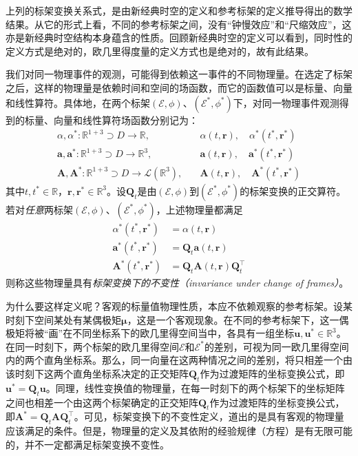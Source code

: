 \documentclass[main.tex]{subfiles}
\begin{document}
上列的标架变换关系式，是由新经典时空的定义和参考标架的定义推导得出的数学结果。从它的形式上看，不同的参考标架之间，没有“钟慢效应”和“尺缩效应”，这亦是新经典时空结构本身蕴含的性质。回顾新经典时空的定义可以看到，同时性的定义方式是绝对的，欧几里得度量的定义方式也是绝对的，故有此结果。

我们对同一物理事件的观测，可能得到依赖这一事件的不同物理量。在选定了标架之后，这样的物理量是依赖时间和空间的场函数，而它的函数值可以是标量、向量和线性算符。具体地，在两个标架$\left(\mathcal{E},\phi\right)$、$\left(\mathcal{E}^*,\phi^*\right)$下，对同一物理事件观测得到的标量、向量和线性算符场函数分别记为：
\begin{align*}
    \alpha,\alpha^*:\mathbb{R}^{1+3}\supset D\rightarrow\mathbb{R},\quad                                   & \alpha\left(t,\mathbf{r}\right),\quad      \alpha^*\left(t^*,\mathbf{r}^*\right)     \\
    \mathbf{a},\mathbf{a}^*:\mathbb{R}^{1+3}\supset D\rightarrow\mathbb{R}^3,\quad                         & \mathbf{a}\left(t,\mathbf{r}\right),\quad  \mathbf{a}^*\left(t^*,\mathbf{r}^*\right) \\
    \mathbf{A},\mathbf{A}^*:\mathbb{R}^{1+3}\supset D\rightarrow\mathcal{L}\left(\mathbb{R}^3\right),\quad & \mathbf{A}\left(t,\mathbf{r}\right),\quad  \mathbf{A}^*\left(t^*,\mathbf{r}^*\right)
\end{align*}
其中$t,t^*\in\mathbb{R}$，$\mathbf{r},\mathbf{r}^*\in\mathbb{R}^3$。设$\mathbf{Q}_t$是由$\left(\mathcal{E},\phi\right)$到$\left(\mathcal{E}^*,\phi^*\right)$的标架变换的正交算符。若对\emph{任意}两标架$\left(\mathcal{E},\phi\right)$、$\left(\mathcal{E}^*,\phi^*\right)$，上述物理量都满足
\begin{align*}
    \alpha^*\left(t^*,\mathbf{r}^*\right)     & =\alpha\left(t,\mathbf{r}\right)                                       \\
    \mathbf{a}^*\left(t^*,\mathbf{r}^*\right) & =\mathbf{Q}_t\mathbf{a}\left(t,\mathbf{r}\right)                       \\
    \mathbf{A}^*\left(t^*,\mathbf{r}^*\right) & =\mathbf{Q}_t\mathbf{A}\left(t,\mathbf{r}\right)\mathbf{Q}_t^\intercal
\end{align*}
则称这些物理量具有\emph{标架变换下的不变性（invariance under change of frames）}。

为什么要这样定义呢？客观的标量值物理性质，本应不依赖观察的参考标架。设某时刻下空间某处有某偶极矩$\symbf{\mu}$，这是一个客观现象。在不同的参考标架下，这一偶极矩将被“画”在不同坐标系下的欧几里得空间当中，各具有一组坐标$\mathbf{u},\mathbf{u}^*\in\mathbb{R}^3$。在同一时刻下，两个标架的欧几里得空间$\mathcal{E}$和$\mathcal{E}^*$的差别，可视为同一欧几里得空间内的两个直角坐标系。那么，同一向量在这两种情况之间的差别，将只相差一个由该时刻下这两个直角坐标系决定的正交矩阵$\mathbf{Q}_t$作为过渡矩阵的坐标变换公式，即$\mathbf{u}^*=\mathbf{Q}_t\mathbf{u}$。同理，线性变换值的物理量，在每一时刻下的两个标架下的坐标矩阵之间也相差一个由这两个标架确定的正交矩阵$\mathbf{Q}_t$作为过渡矩阵的坐标变换公式，即$\mathbf{A}^*=\mathbf{Q}_t\mathbf{A}\mathbf{Q}_t^\intercal$。可见，标架变换下的不变性定义，道出的是具有客观的物理量应该满足的条件。但是，物理量的定义及其依附的经验规律（方程）是有无限可能的，并不一定都满足标架变换不变性。
\end{document}
